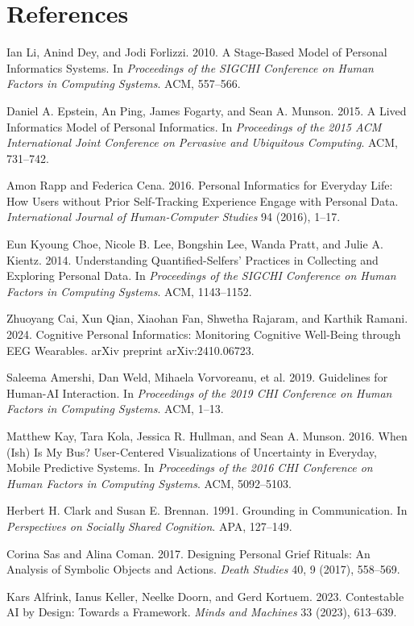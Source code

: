 \section*{References}
\begin{enumerate}[label={[\arabic*]},leftmargin=2.2em,itemsep=2pt,topsep=2pt]
\item Ian Li, Anind Dey, and Jodi Forlizzi. 2010. A Stage-Based Model of Personal Informatics Systems. In \textit{Proceedings of the SIGCHI Conference on Human Factors in Computing Systems}. ACM, 557--566.
\item Daniel A. Epstein, An Ping, James Fogarty, and Sean A. Munson. 2015. A Lived Informatics Model of Personal Informatics. In \textit{Proceedings of the 2015 ACM International Joint Conference on Pervasive and Ubiquitous Computing}. ACM, 731--742.
\item Amon Rapp and Federica Cena. 2016. Personal Informatics for Everyday Life: How Users without Prior Self-Tracking Experience Engage with Personal Data. \textit{International Journal of Human-Computer Studies} 94 (2016), 1--17.
\item Eun Kyoung Choe, Nicole B. Lee, Bongshin Lee, Wanda Pratt, and Julie A. Kientz. 2014. Understanding Quantified-Selfers' Practices in Collecting and Exploring Personal Data. In \textit{Proceedings of the SIGCHI Conference on Human Factors in Computing Systems}. ACM, 1143--1152.
\item Zhuoyang Cai, Xun Qian, Xiaohan Fan, Shwetha Rajaram, and Karthik Ramani. 2024. Cognitive Personal Informatics: Monitoring Cognitive Well-Being through EEG Wearables. arXiv preprint arXiv:2410.06723.
\item Saleema Amershi, Dan Weld, Mihaela Vorvoreanu, et al. 2019. Guidelines for Human-AI Interaction. In \textit{Proceedings of the 2019 CHI Conference on Human Factors in Computing Systems}. ACM, 1--13.
\item Matthew Kay, Tara Kola, Jessica R. Hullman, and Sean A. Munson. 2016. When (Ish) Is My Bus? User-Centered Visualizations of Uncertainty in Everyday, Mobile Predictive Systems. In \textit{Proceedings of the 2016 CHI Conference on Human Factors in Computing Systems}. ACM, 5092--5103.
\item Herbert H. Clark and Susan E. Brennan. 1991. Grounding in Communication. In \textit{Perspectives on Socially Shared Cognition}. APA, 127--149.
\item Corina Sas and Alina Coman. 2017. Designing Personal Grief Rituals: An Analysis of Symbolic Objects and Actions. \textit{Death Studies} 40, 9 (2017), 558--569.
\item Kars Alfrink, Ianus Keller, Neelke Doorn, and Gerd Kortuem. 2023. Contestable AI by Design: Towards a Framework. \textit{Minds and Machines} 33 (2023), 613--639.
\end{enumerate}


